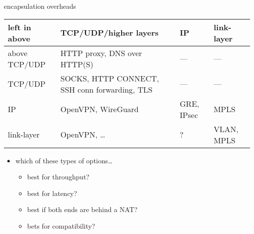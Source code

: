 \begin{frame}{encapsulation overheads}
\begin{tabular}{l||p{4cm}|p{4cm}|p{2cm}}
left in above       & TCP/UDP/higher layers & IP & link-layer \\ \hline \hline
above TCP/UDP       & HTTP proxy, DNS over HTTP(S) & --- & --- \\ \hline
TCP/UDP             & SOCKS, HTTP CONNECT, SSH conn forwarding, TLS & --- & --- \\\hline
IP                  & OpenVPN, WireGuard & GRE, IPsec & MPLS \\\hline
link-layer          & OpenVPN, \ldots & ? & VLAN, MPLS \\\hline
\end{tabular}
\begin{itemize}
\item which of these types of options\ldots
    \begin{itemize}
    \item best for throughput?
    \item best for latency?
    \item best if both ends are behind a NAT?
    \item bets for compatibility?
    \end{itemize}
\end{itemize}
\end{frame}
